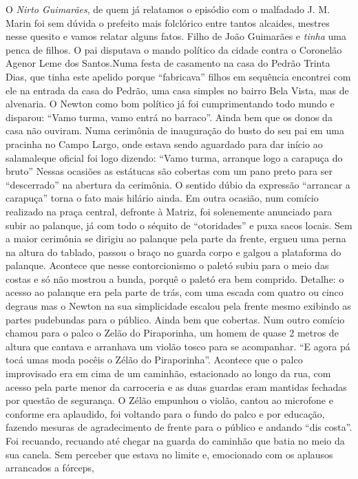\documentclass[12pt,brazil,]{book}
\begin{document}
O \emph{Nirto Guimarães}, de quem já relatamos o episódio com o
malfadado J. M. Marin foi sem dúvida o prefeito mais folclórico entre
tantos alcaides, mestres nesse quesito e vamos relatar alguns fatos.
Filho de João Guimarães e \emph{tinha} uma penca de filhos. O pai
disputava o mando político da cidade contra o Coronelão Agenor Leme dos
Santos.Numa festa de casamento na casa do Pedrão Trinta Dias, que tinha
este apelido porque ``fabricava'' filhos em sequência encontrei com ele
na entrada da casa do Pedrão, uma casa simples no bairro Bela Vista, mas
de alvenaria. O Newton como bom político já foi cumprimentando todo
mundo e disparou: ``Vamo turma, vamo entrá no barraco''. Ainda bem que
os donos da casa não ouviram. Numa cerimônia de inauguração do busto do
seu pai em uma pracinha no Campo Largo, onde estava sendo aguardado para
dar início ao salamaleque oficial foi logo dizendo: ``Vamo turma,
arranque logo a carapuça do bruto'' Nessas ocasiões as estátucas são
cobertas com um pano preto para ser ``descerrado'' na abertura da
cerimônia. O sentido dúbio da expressão ``arrancar a carapuça'' torna o
fato mais hilário ainda. Em outra ocasião, num comício realizado na
praça central, defronte à Matriz, foi solenemente anunciado para subir
ao palanque, já com todo o séquito de ``otoridades'' e puxa sacos
locais. Sem a maior cerimônia se dirigiu ao palanque pela parte da
frente, ergueu uma perna na altura do tablado, passou o braço no guarda
corpo e galgou a plataforma do palanque. Acontece que nesse
contorcionismo o paletó subiu para o meio das costas e só não mostrou a
bunda, porquê o paletó era bem comprido. Detalhe: o acesso ao palanque
era pela parte de trás, com uma escada com quatro ou cinco degraus mas o
Newton na sua simplicidade escalou pela frente mesmo exibindo as partes
pudebundas para o público. Ainda bem que cobertas. Num outro comício
chamou para o palco o Zelão do Piraporinha, um homem de quase 2 metros
de altura que cantava e arranhava um violão tosco para se acompanhar.
``E agora pá tocá umas moda pocêis o Zélão do Piraporinha''. Acontece
que o palco improvisado era em cima de um caminhão, estacionado ao longo
da rua, com acesso pela parte menor da carroceria e as duas guardas eram
mantidas fechadas por questão de segurança. O Zélão empunhou o violão,
cantou ao microfone e conforme era aplaudido, foi voltando para o fundo
do palco e por educação, fazendo mesuras de agradecimento de frente para
o público e andando ``dis costa''. Foi recuando, recuando até chegar na
guarda do caminhão que batia no meio da sua canela. Sem perceber que
estava no limite e, emocionado com os aplausos arrancados a fórceps,
\end{document}

